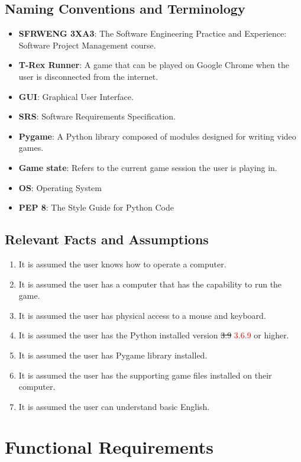 \documentclass[12pt, titlepage]{article}
\begin{document}
\subsection{Naming Conventions and Terminology}
\begin{itemize}
    \item \textbf{SFRWENG 3XA3}: The Software Engineering Practice and Experience: Software Project Management course.
    \item \textbf{T-Rex Runner}: A game that can be played on Google Chrome when the user is disconnected from the internet.
    \item \textbf{GUI}: Graphical User Interface.
    \item \textbf{SRS}: Software Requirements Specification.
    \item \textbf{Pygame}: A Python library composed of modules designed for writing video games.
    \item \textbf{Game state}: Refers to the current game session the user is playing in.
    \item \textbf{OS}: Operating System
    \item \textbf{PEP 8}: The Style Guide for Python Code
\end{itemize}

\subsection{Relevant Facts and Assumptions}
\begin{enumerate}
    \item It is assumed the user knows how to operate a computer.
    \item It is assumed the user has a computer that has the capability to run the game.
    \item It is assumed the user has physical access to a mouse and keyboard.
    \item It is assumed the user has the Python installed version \sout{3.9} \textcolor{red}{3.6.9} or higher.
    \item It is assumed the user has Pygame library installed.
    \item It is assumed the user has the supporting game files installed on their computer.
    \item It is assumed the user can understand basic English.
\end{enumerate}

\section{Functional Requirements}
\end{document}
